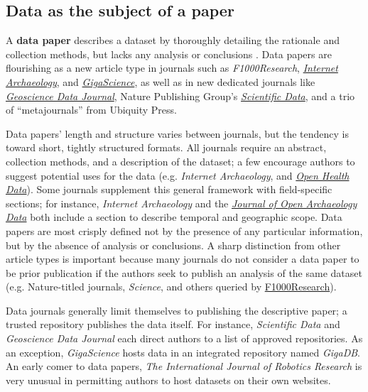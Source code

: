 \documentclass[10pt,twocolumn]{article}
\begin{document}
\subsection*{Data as the subject of a paper}\label{paper-subject-data}

A \textbf{data paper} describes a dataset by thoroughly detailing the rationale and collection methods, but lacks any analysis or conclusions \cite{newman_data_2009}.
Data papers are flourishing as a new article type in journals such as \emph{F1000Research}, \href{http://www.internetarchaeology.org/}{\emph{Internet Archaeology}}, and \href{http://www.gigasciencejournal.com/}{\emph{GigaScience}}\cite{gigascience}, as well as in new dedicated journals like \href{http://onlinelibrary.wiley.com/journal/10.1002/%28ISSN%292049-6060}{\emph{Geoscience Data Journal}}\cite{geoscience_data_journal}, Nature Publishing Group's \href{http://www.nature.com/scientificdata/}{\emph{Scientific Data}}, and a trio of ``metajournals'' from Ubiquity Press.

Data papers' length and structure varies between journals, but the tendency is toward short, tightly structured formats.
All journals require an abstract, collection methods, and a description of the dataset; a few encourage authors to suggest potential uses for the data (e.g. \emph{Internet Archaeology}, and \href{http://openhealthdata.metajnl.com/about/submissions#authorGuidelines}{\emph{Open Health Data}}).
Some journals supplement this general framework with field-specific sections; for instance, \emph{Internet Archaeology} and the \href{http://openarchaeologydata.metajnl.com/}{\emph{Journal of Open Archaeology Data}} both include a section to describe temporal and geographic scope.
Data papers are most crisply defined not by the presence of any particular information, but by the absence of analysis or conclusions.
A sharp distinction from other article types is important because many journals do not consider a data paper to be prior publication if the authors seek to publish an analysis of the same dataset (e.g. Nature-titled journals, \emph{Science}, and others queried by \href{https://f1000research.com/data-policies}{F1000Research}).

Data journals generally limit themselves to publishing the descriptive paper; a trusted repository publishes the data itself.
For instance, \emph{Scientific Data} and \emph{Geoscience Data Journal} each direct authors to a list of approved repositories.
As an exception, \emph{GigaScience} hosts data in an integrated repository named \emph{GigaDB}.
An early comer to data papers, \emph{The International Journal of Robotics Research}\cite{international_journal_of_robotics_research}\cite{newman_data_2009} is very unusual in permitting authors to host datasets on their own websites.
\end{document}
